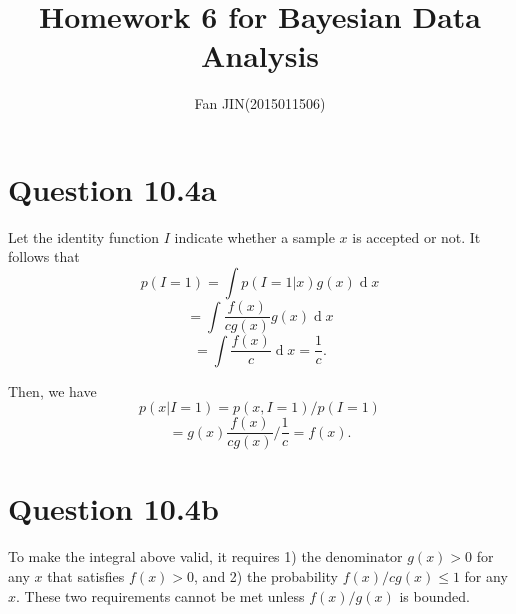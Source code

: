 \documentclass{article}
\DeclareMathOperator*{\deriv}{d}
\begin{document}
\title{\textsf{Homework 6 for Bayesian Data Analysis}}
\author{Fan JIN\quad (2015011506)}
\maketitle

\section*{Question 10.4a}
{
    Let the identity function $I$ indicate whether a sample $x$ is accepted or not. It follows that 
    $$p(I=1) = \int{ p(I=1 | x) g(x) \deriv{x} }$$
    $$= \int{ \frac{f(x)}{c g(x)} g(x) \deriv{x} }$$
    $$= \int{ \frac{f(x)}{c} \deriv{x} } = \frac{1}{c}.$$

    Then, we have 
    $$p(x | I=1) = p(x, I=1) / p(I=1)$$
    $$= g(x) \frac{f(x)}{c g(x)} / \frac{1}{c} = f(x).$$
}

\section*{Question 10.4b}
{
    To make the integral above valid, it requires 1) the denominator $g(x)>0$ for any $x$ that satisfies $f(x)>0$, and 2) the probability $f(x) / c g(x) \leq 1$ for any $x$. These two requirements cannot be met unless $f(x)/g(x)$ is bounded.
}
\end{document}

